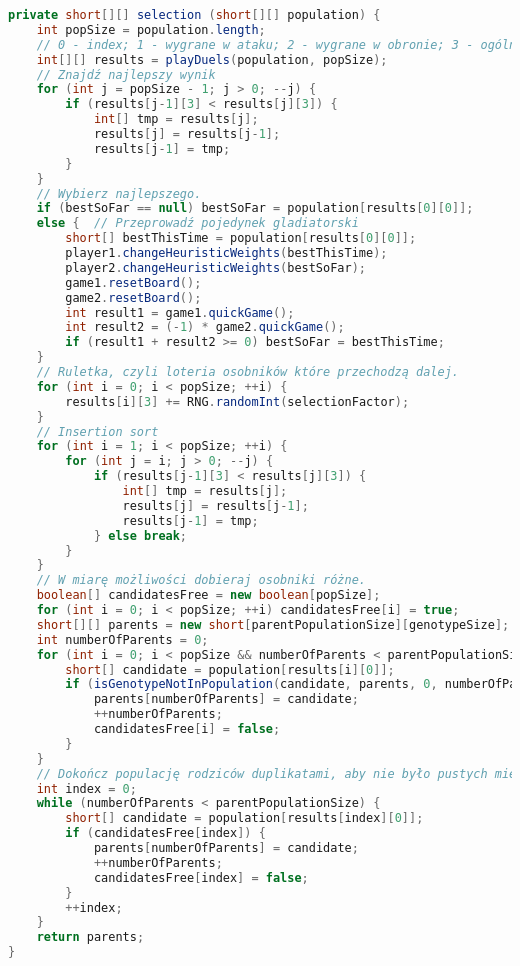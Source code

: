 \begin{footnotesize}
\begin{lstlisting}[language=Java, frame=lines, numberstyle=\tiny, stepnumber=5, caption=Metoda selekcji w algorytmie genetycznym, firstnumber=1]
private short[][] selection (short[][] population) {
    int popSize = population.length;
    // 0 - index; 1 - wygrane w ataku; 2 - wygrane w obronie; 3 - ogólny wynik.
    int[][] results = playDuels(population, popSize);
    // Znajdź najlepszy wynik
    for (int j = popSize - 1; j > 0; --j) {
        if (results[j-1][3] < results[j][3]) {
            int[] tmp = results[j];
            results[j] = results[j-1];
            results[j-1] = tmp;
        }
    }
    // Wybierz najlepszego.
    if (bestSoFar == null) bestSoFar = population[results[0][0]];
    else {  // Przeprowadź pojedynek gladiatorski
        short[] bestThisTime = population[results[0][0]];
        player1.changeHeuristicWeights(bestThisTime);
        player2.changeHeuristicWeights(bestSoFar);
        game1.resetBoard();
        game2.resetBoard();
        int result1 = game1.quickGame();
        int result2 = (-1) * game2.quickGame();
        if (result1 + result2 >= 0) bestSoFar = bestThisTime;
    }
    // Ruletka, czyli loteria osobników które przechodzą dalej.
    for (int i = 0; i < popSize; ++i) {
        results[i][3] += RNG.randomInt(selectionFactor);
    }
    // Insertion sort
    for (int i = 1; i < popSize; ++i) {
        for (int j = i; j > 0; --j) {
            if (results[j-1][3] < results[j][3]) {
                int[] tmp = results[j];
                results[j] = results[j-1];
                results[j-1] = tmp;
            } else break;
        }
    }
    // W miarę możliwości dobieraj osobniki różne.
    boolean[] candidatesFree = new boolean[popSize];
    for (int i = 0; i < popSize; ++i) candidatesFree[i] = true;
    short[][] parents = new short[parentPopulationSize][genotypeSize];
    int numberOfParents = 0;
    for (int i = 0; i < popSize && numberOfParents < parentPopulationSize; ++i) {
        short[] candidate = population[results[i][0]];
        if (isGenotypeNotInPopulation(candidate, parents, 0, numberOfParents)) {
            parents[numberOfParents] = candidate;
            ++numberOfParents;
            candidatesFree[i] = false;
        }
    }
    // Dokończ populację rodziców duplikatami, aby nie było pustych miejsc.
    int index = 0;
    while (numberOfParents < parentPopulationSize) {
        short[] candidate = population[results[index][0]];
        if (candidatesFree[index]) {
            parents[numberOfParents] = candidate;
            ++numberOfParents;
            candidatesFree[index] = false;
        }
        ++index;
    }
    return parents;
}
\end{lstlisting} 
\end{footnotesize}

